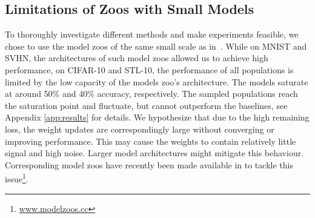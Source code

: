 \documentclass{article}
\begin{document}
\subsection{Limitations of Zoos with Small Models}\label{sec:limitations}
To thoroughly investigate different methods and make experiments feasible, we chose to use the model zoos of the same small scale as in~\citep{schurholtSelfSupervisedRepresentationLearning2021}. 
While on MNIST and SVHN, the architectures of such model zoos allowed us to achieve high performance, on CIFAR-10 and STL-10, the performance of all populations is limited by the low capacity of the models zoo's architecture. The models saturate at around 50\% and 40\% accuracy, respectively. 
The sampled populations reach the saturation point and fluctuate, but cannot outperform the baselines, see Appendix \ref{app:results} for details. 
We hypothesize that due to the high remaining loss, the weight updates are correspondingly large without converging or improving performance. 
This may cause the weights to contain relatively little signal and high noise. 
Larger model architectures might mitigate this behaviour. Corresponding model zoos have recently been made available in \citep{schurholtModelZoosDataset2022} to tackle this issue\footnote{\href{www.modelzoos.cc}{www.modelzoos.cc}}.
\end{document}
